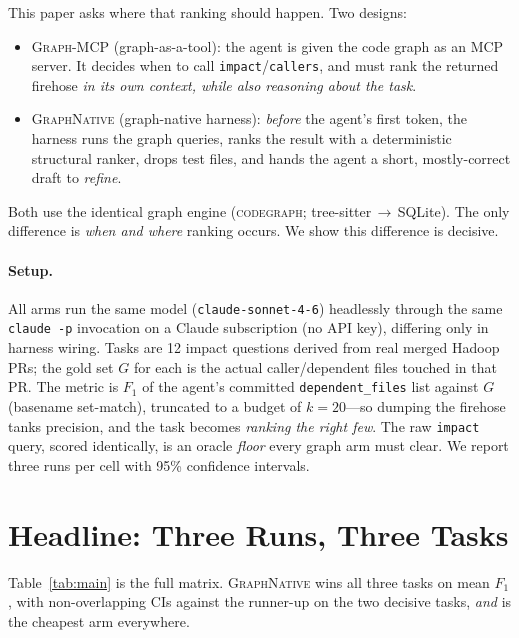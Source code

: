 \documentclass[11pt,twocolumn]{article}
\newcommand{\gn}{{\normalfont\scshape GraphNative}}
\newcommand{\mcp}{{\normalfont\scshape Graph-MCP}}
\begin{document}
This paper asks where that ranking should happen. Two designs:
\begin{itemize}
  \item \mcp{} (graph-as-a-tool): the agent is given the code graph as an MCP server. It decides
  when to call \texttt{impact}/\texttt{callers}, and must rank the returned firehose \emph{in its
  own context, while also reasoning about the task}.
  \item \gn{} (graph-native harness): \emph{before} the agent's first token, the harness runs the
  graph queries, ranks the result with a deterministic structural ranker, drops test files, and
  hands the agent a short, mostly-correct draft to \emph{refine}.
\end{itemize}
Both use the identical graph engine (\textsc{codegraph}; tree-sitter\,$\to$\,SQLite). The only
difference is \emph{when and where} ranking occurs. We show this difference is decisive.

\paragraph{Setup.} All arms run the same model (\texttt{claude-sonnet-4-6}) headlessly through the
same \texttt{claude -p} invocation on a Claude subscription (no API key), differing only in harness
wiring. Tasks are 12 impact questions derived from real merged Hadoop PRs; the gold set $G$ for each
is the actual caller/dependent files touched in that PR. The metric is $F_1$ of the agent's
committed \texttt{dependent\_files} list against $G$ (basename set-match), truncated to a budget of
$k{=}20$---so dumping the firehose tanks precision, and the task becomes \emph{ranking the right few}.
The raw \texttt{impact} query, scored identically, is an oracle \emph{floor} every graph arm must
clear. We report three runs per cell with 95\% confidence intervals.

\section{Headline: Three Runs, Three Tasks}

Table~\ref{tab:main} is the full matrix. \gn{} wins all three tasks on mean $F_1$, with
non-overlapping CIs against the runner-up on the two decisive tasks, \emph{and} is the cheapest arm
everywhere.
\end{document}

